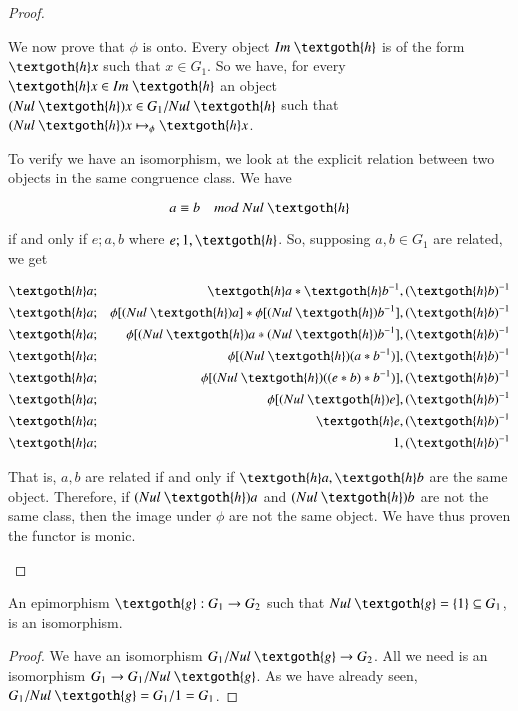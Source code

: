 \documentclass [12pt]{book}
\begin{document}
\begin{proof}
\begin{itemize}
We now prove that $\phi$ is onto. Every object $Im~\textgoth{h}$ is of the form $\textgoth{h}x$ such that $x\in G_{1}$. So we have, for every $\textgoth{h}x\in Im~\textgoth{h}$ an object $(Nul~\textgoth{h})x\in G_{1}/Nul~\textgoth{h}$ such that $(Nul~\textgoth{h})x\mapsto_{\phi}\textgoth{h}x$.

To verify we have an isomorphism, we look at the explicit relation between two objects in the same congruence class. We have 

$$a\equiv b~~~~mod~Nul~\textgoth{h}$$

if and only if $e;a,b$ where $e;1,\textgoth{h}$. So, supposing $a,b\in G_1$ are related, we get

\begin{eqnarray}\nonumber \textgoth{h}a&;&\textgoth{h}a*\textgoth{h}b^{-1},(\textgoth{h}b)^{-1}\\\nonumber \textgoth{h}a&;&\phi[(Nul~\textgoth{h})a]*\phi[(Nul~\textgoth{h})b^{-1}],(\textgoth{h}b)^{-1}\\\nonumber \textgoth{h}a&;&\phi
[(Nul~\textgoth{h})a*(Nul~\textgoth{h})b^{-1}],(\textgoth{h}b)^{-1}\\\nonumber\textgoth{h}a&;&\phi[(Nul~\textgoth{h})(a*b^{-1})],(\textgoth{h}b)^{-1}\\\nonumber\textgoth{h}a&;&\phi[(Nul~\textgoth{h})((e*b)*b^{-1})],(\textgoth{h}b)^{-1}\\\nonumber\textgoth{h}a&;&\phi[(Nul~\textgoth{h})e],(\textgoth{h}b)^{-1}\\\nonumber\textgoth{h}a&;&\textgoth{h}e,(\textgoth{h}b)^{-1}\\\nonumber\textgoth{h}a&;&1,(\textgoth{h}b)^{-1}\end{eqnarray}

That is, $a,b$ are related if and only if $\textgoth{h}a,\textgoth{h}b$ are the same object. Therefore, if $(Nul~\textgoth{h})a$ and $(Nul~\textgoth{h})b$ are not the same class, then the image under $\phi$ are not the same object. We have thus proven the functor is monic.

\end{itemize}\end{proof}

\begin{theorem}An epimorphism $\textgoth{g}:G_{1}\rightarrow G_{2}$ such that $Nul~\textgoth{g}=\{1\}\subseteq G_{1}$, is an isomorphism.\end{theorem}

\begin{proof}We have an isomorphism $G_{1}/Nul~\textgoth{g}\rightarrow G_{2}$. All we need is an isomorphism $G_{1}\rightarrow G_{1}/Nul~\textgoth{g}$. As we have already seen, $G_{1}/Nul~\textgoth{g}=G_{1}/1=G_{1}$.\end{proof}
\end{document}
